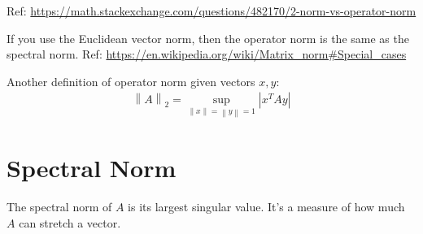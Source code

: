 \documentclass[11pt]{article}
\newcommand{\eq}[1]{\begin{align*}#1\end{align*}}
\newcommand{\norm}[1]{\left\lVert#1\right\rVert}
\begin{document}
Ref: \url{https://math.stackexchange.com/questions/482170/2-norm-vs-operator-norm}

If you use the Euclidean vector norm, then the operator norm is the same as the spectral norm. Ref: \url{https://en.wikipedia.org/wiki/Matrix_norm#Special_cases}

Another definition of operator norm given vectors $x, y$:
\eq{
\norm{A}_2 = \sup_{\norm{x}=\norm{y}=1} |x^T A y|
}

\section{Spectral Norm}

The spectral norm of $A$ is its largest singular value. It's a measure of how much $A$ can stretch a vector.
\end{document}
